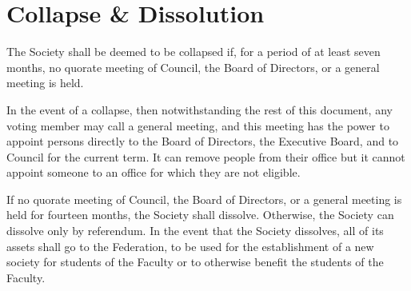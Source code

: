 \section{Collapse \& Dissolution}
The Society shall be deemed to be collapsed if, for a period of at least seven
months, no quorate meeting of Council, the Board of Directors, or a general
meeting is held.

In the event of a collapse, then notwithstanding the rest of this document, any
voting member may call a general meeting, and this meeting has the power to
appoint persons directly to the Board of Directors, the Executive Board, and to
Council for the current term. It can remove people from their office but it
cannot appoint someone to an office for which they are not eligible.

If no quorate meeting of Council, the Board of Directors, or a general meeting
is held for fourteen months, the Society shall dissolve. Otherwise, the Society
can dissolve only by referendum.  In the event that the Society dissolves, all
of its assets shall go to the Federation, to be used for the establishment of a
new society for students of the Faculty or to otherwise benefit the students of
the Faculty.
